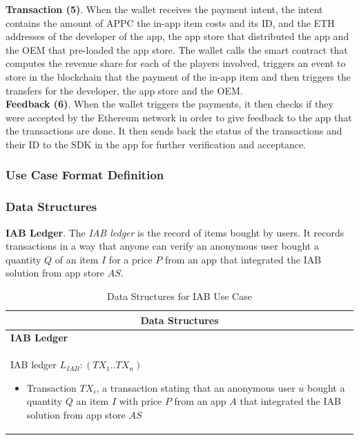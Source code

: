 \noindent \textbf{Transaction (5)}. When the wallet receives the payment intent, the intent contains the amount of APPC the in-app item costs and its ID, and the ETH addresses of the developer of the app, the app store that distributed the app and the OEM that pre-loaded the app store. The wallet calls the smart contract that computes the revenue share for each of the players involved, triggers an event to store in the blockchain that the payment of the in-app item and then triggers the transfers for the developer, the app store and the OEM. \\

\noindent \textbf{Feedback (6)}. When the wallet triggers the payments, it then checks if they were accepted by the Ethereum network in order to give feedback to the app that the transactions are done. It then sends back the status of the transactions and their ID to the SDK in the app for further verification and acceptance.

\subsubsection{Use Case Format Definition}
\label{sssec:iab_fd}

\subsubsection{Data Structures}

\noindent \textbf{IAB Ledger}. The \textit{IAB ledger} is the record of items bought by users. It records transactions in a way that anyone can verify an anonymous user bought a quantity $Q$ of an item $I$ for a price $P$ from an app that integrated the IAB solution from app store $AS$.
\begin{table}[H]
\footnotesize
\centering
\begin{tabular}{|p{}|}
\hline
\multicolumn{1}{|c|}{Data Structures} \\
\hline \vspace{0.05cm}
\textbf{IAB Ledger} \\
IAB ledger $L_{IAB} : (TX_1..TX_n)$
\begin{itemize}
	\item Transaction $TX_i$, a transaction stating that an anonymous user $u$ bought a quantity $Q$ an item $I$ with price $P$ from an app $A$ that integrated the IAB solution from app store $AS$
\end{itemize} \\
\hline
\end{tabular}
\caption{Data Structures for IAB Use Case}
\label{table: data_structures_iab}
\end{table}


